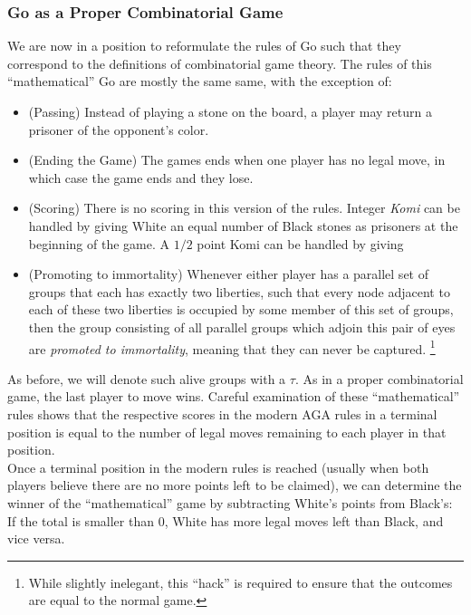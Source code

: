 \documentclass[../math194_paper.tex]{subfiles}
\begin{document}
\subsubsection{Go as a Proper Combinatorial Game}
We are now in a position to reformulate
the rules of Go such that they correspond to the definitions of combinatorial game
theory. The rules of this ``mathematical'' Go are mostly the same same, with the exception of:
\begin{itemize}
    \item (Passing) Instead of playing a stone on the board, a player may 
    return a prisoner of the opponent's color.
    \item (Ending the Game) The games ends when one player has no legal 
    move, in which case the game ends and they lose. 
    \item (Scoring) There is no scoring in this version of the rules. Integer \textit{Komi} 
    can be handled by giving White an equal number of Black stones as prisoners at the 
    beginning of the game. A $1/2$ point Komi can be handled by giving 
    \item (Promoting to immortality) Whenever either player has a parallel set of groups that
    each has exactly two liberties, such  that every node adjacent to each of these two
    liberties is occupied  by some member of this set of groups, then the group consisting of 
    all parallel groups which adjoin this pair of eyes are \textit{promoted to immortality}, 
    meaning that they can never be captured.  
    \footnote{While slightly inelegant, this ``hack'' is required to ensure that the 
    outcomes are equal to the normal game.}
\end{itemize}
As before, we will denote such alive groups with a $\tau$. As in a proper combinatorial game, 
the last player to move wins. Careful examination of these ``mathematical'' rules shows 
that the respective scores in the modern AGA rules in a terminal position is equal to the 
number of legal moves remaining to each player in that position. \\
Once a terminal position in the modern rules is reached (usually when both players believe
there are no more points left to be claimed), we can determine the winner of the 
``mathematical'' game by subtracting White's points from Black's: 
If the total is smaller than 0, White has more legal moves left than Black, and vice versa.
\end{document}
